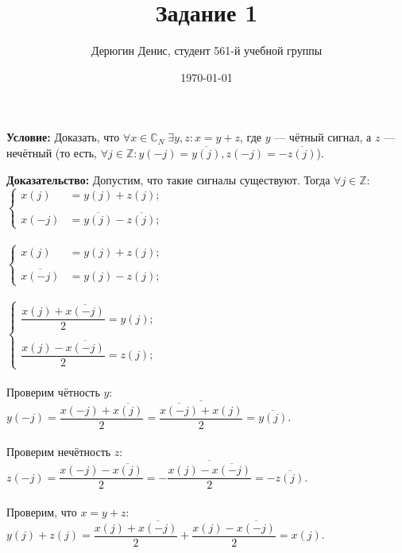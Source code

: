 \documentclass[38pt]{article}
\title{Задание 1}
\author{
	Дерюгин Денис, студент 561-й учебной группы
}
\date{\today}
\begin{document}
\maketitle
\large{
	\textbf{Условие:} Доказать, что $\forall x \in \mathbb{C}_{N} \; \exists y, z : x = y + z$, где $y$ --- чётный сигнал, а $z$ --- нечётный (то есть, $\forall j \in \mathbb{Z} : y(-j) = \overline{y(j)}, z(-j) = -\overline{z(j)}$).

\textbf{Доказательство:} Допустим, что такие сигналы существуют. Тогда $\forall j \in \mathbb{Z}$:\\

$\left\{
\begin{matrix}
	x(j) & = y(j) + z(j); \\ 
	\\
	x(-j) & = \overline{y(j)} - \overline{z(j)};
\end{matrix}
\right.$\\
\\

$\left\{
\begin{matrix}
	x(j) & = y(j) + z(j); \\ 
	\\
	\overline{x(-j)} & = y(j) - z(j);
\end{matrix}
\right.$\\
\\

$\left\{
\begin{matrix}
	\dfrac{x(j) + \overline{x(-j)}}{2} = y(j); \\
	\\
	\dfrac{x(j) - \overline{x(-j)}}{2} = z(j);
\end{matrix}
\right.$\\
\\

Проверим чётность $y$:\\
$y(-j) = \dfrac{x(-j) + \overline{x(j)}}{2} = \dfrac{\overline{\overline{x(-j)} + {x(j)}}}{2} = \overline{y(j)}.$\\
\\

Проверим нечётность $z$:\\
$z(-j) = \dfrac{x(-j) - \overline{x(j)}}{2} = -\dfrac{\overline{{x(j)} - \overline{x(-j)}}}{2}= -\overline{z(j)}.$\\
\\

Проверим, что $x = y + z$:\\
$y(j) + z(j) = \dfrac{x(j) + \overline{x(-j)}}{2} + \dfrac{x(j) - \overline{x(-j)}}{2} = x(j).$

\raggedleft{}{$\blacksquare$}

}
\end{document}

